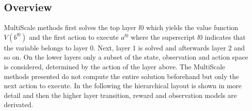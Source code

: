 \subsection{Overview} \label{subsec:MultiScale_overview}
MultiScale methods first solves the top layer $l0$ which yields the value function $V(b^{l0})$ and the first action to execute $a^{l0}$ where the superscript $l0$ indicates that the variable belongs to layer 0. Next, layer 1 is solved and afterwards layer 2 and so on. On the lower layers only a subset of the state, observation and action space is considered, determined by the action of the layer above. The MultiScale methods presented do not compute the entire solution beforehand but only the next action to execute. In the following the hierarchical layout is shown in more detail and then the higher layer transition, reward and observation models are derivated.

